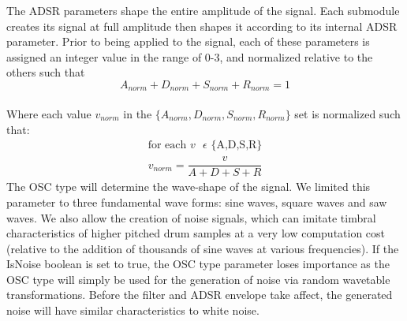 \documentclass[\main/thesis.tex]{subfiles}
\begin{document}
\begin{table}[t!]
\centering
{}
\caption{Synthesizer submodule Parameters. Despite the simplicity of the parameters and our efforts at constraining the ranges, the number of parameters that can be randomly chosen for each submodule is in the order of $10^{15}$ }
\label{table:submodule_params}
\end{table}
The ADSR parameters shape the entire amplitude of the signal. Each submodule creates its signal at full amplitude then shapes it according to its internal ADSR parameter. Prior to being applied to the signal, each of these parameters is assigned an integer value in the range of 0-3, and normalized relative to the others such that \[ A_{norm} + D_{norm} + S_{norm} + R_{norm} = 1 \] \\ 
Where each value $v_{norm}$ in the $\{A_{norm}, D_{norm},S_{norm},R_{norm}\} $ set is normalized such that:
\begin{align*}
\text{for each $v$ $\epsilon$ \{A,D,S,R\}} \\
v_{norm} = \dfrac{v}{A + D + S + R}
\end{align*}
 The OSC type will determine the wave-shape of the signal. We limited this parameter to three fundamental wave forms: sine waves, square waves and saw waves. We also allow the creation of noise signals, which can imitate timbral characteristics of higher pitched drum samples at a very low computation cost (relative to the addition of thousands of sine waves at various frequencies). If the IsNoise boolean is set to true, the OSC type parameter loses importance as the OSC type will simply be used for the generation of noise via random wavetable transformations. Before the filter and ADSR envelope take affect, the generated noise will have similar characteristics to white noise. 
\end{document}
